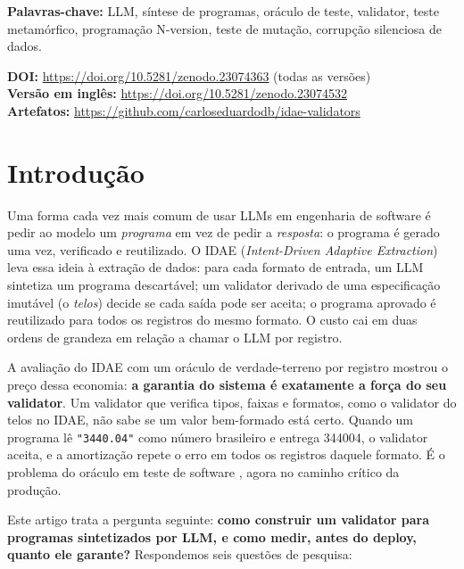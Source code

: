 \documentclass[sigconf,nonacm]{acmart}
\begin{document}
\textbf{Palavras-chave:} LLM, síntese de programas, oráculo de teste, validator, teste metamórfico, programação N-version, teste de mutação, corrupção silenciosa de dados.

\noindent\textbf{DOI:} \url{https://doi.org/10.5281/zenodo.23074363} (todas as versões)\\
\textbf{Versão em inglês:} \url{https://doi.org/10.5281/zenodo.23074532}\\
\textbf{Artefatos:} \url{https://github.com/carloseduardodb/idae-validators}

\section{Introdução}

Uma forma cada vez mais comum de usar LLMs em engenharia de software é pedir ao modelo um \textit{programa} em vez de pedir a \textit{resposta}: o programa é gerado uma vez, verificado e reutilizado. O IDAE (\textit{Intent-Driven Adaptive Extraction}) \cite{batista2026idae} leva essa ideia à extração de dados: para cada formato de entrada, um LLM sintetiza um programa descartável; um validator derivado de uma especificação imutável (o \textit{telos}) decide se cada saída pode ser aceita; o programa aprovado é reutilizado para todos os registros do mesmo formato. O custo cai em duas ordens de grandeza em relação a chamar o LLM por registro.

A avaliação do IDAE com um oráculo de verdade-terreno por registro mostrou o preço dessa economia: \textbf{a garantia do sistema é exatamente a força do seu validator}. Um validator que verifica tipos, faixas e formatos, como o validator do telos no IDAE, não sabe se um valor bem-formado está certo. Quando um programa lê \texttt{"3440.04"} como número brasileiro e entrega 344004, o validator aceita, e a amortização repete o erro em todos os registros daquele formato. É o problema do oráculo em teste de software \cite{barr2015oracle}, agora no caminho crítico da produção.

Este artigo trata a pergunta seguinte: \textbf{como construir um validator para programas sintetizados por LLM, e como medir, antes do deploy, quanto ele garante?} Respondemos seis questões de pesquisa:
\end{document}
